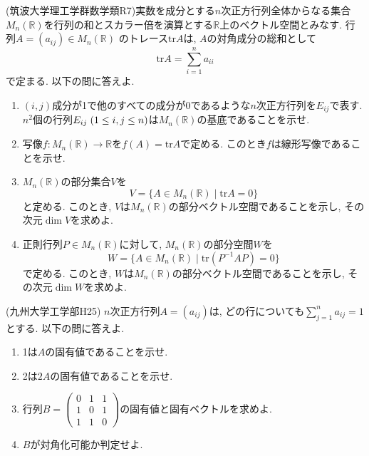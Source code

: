 \documentclass[a4j,dvipdfmx]{jsarticle}
\newcommand{\R}{\mathbb{R}}
\newcommand{\tr}{\mathrm{tr}}
\begin{document}
    \begin{screen}
        (筑波大学理工学群数学類R7)実数を成分とする$n$次正方行列全体からなる集合$M_n(\R)$を行列の和とスカラー倍を演算とする$\R$上のベクトル空間とみなす. 行列$A=(a_{ij})\in M_n(\R)$
        のトレース$\tr A$は, $A$の対角成分の総和として
        \begin{equation*}
            \tr A = \sum_{i=1}^{n}a_{ii}
        \end{equation*}
        で定まる. 以下の問に答えよ.
        \begin{enumerate}
            \item $(i,j)$成分が1で他のすべての成分が0であるような$n$次正方行列を$E_{ij}$で表す. $n^2$個の行列$E_{ij}\hspace{1mm}(1\leq i,j\leq n)$は$M_n(\R)$の基底であることを示せ.
            \item 写像$f:M_n(\R)\to \R$を$f(A)=\tr A$で定める. このとき$f$は線形写像であることを示せ.
            \item $M_n(\R)$の部分集合$V$を
            \begin{equation*}
                V=\{A\in M_n(\R)\mid \tr A=0\}
            \end{equation*}
            と定める. このとき, $V$は$M_n(\R)$の部分ベクトル空間であることを示し, その次元$\dim V$を求めよ.
            \item 正則行列$P\in M_n(\R)$に対して, $M_n(\R)$の部分空間$W$を
            \begin{equation*}
                W=\{A\in M_n(\R)\mid \tr (P^{-1}AP)=0\}
            \end{equation*}
            で定める. このとき, $W$は$M_n(\R)$の部分ベクトル空間であることを示し, その次元$\dim W$を求めよ.
        \end{enumerate}
    \end{screen}
    \clearpage
    \begin{screen}
        (九州大学工学部H25) $n$次正方行列$A=(a_{ij})$は, どの行についても$\sum_{j=1}^{n}a_{ij}=1$とする. 以下の問に答えよ.
        \begin{enumerate}
            \item 1は$A$の固有値であることを示せ.
            \item 2は$2A$の固有値であることを示せ.
            \item 行列$B=\begin{pmatrix}
                0 & 1 & 1\\
                1 & 0 & 1\\
                1 & 1 & 0
            \end{pmatrix}$の固有値と固有ベクトルを求めよ.
            \item $B$が対角化可能か判定せよ.
        \end{enumerate}
    \end{screen}
\end{document}
